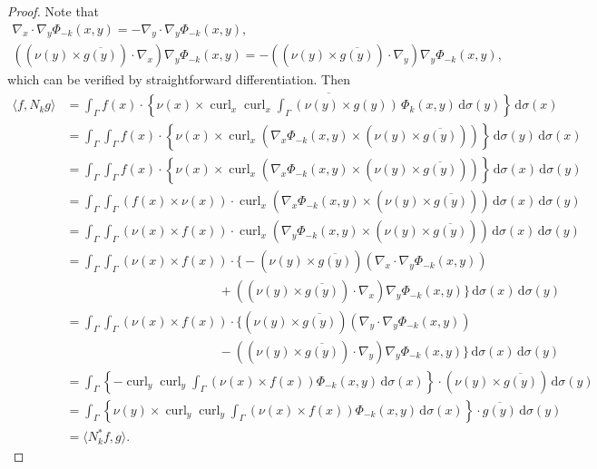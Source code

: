 \documentclass[a4paper,12pt]{article}
\theoremstyle{definition}
\newcommand\bdr{\Gamma}
\newcommand\ints[2][y]{\int_{\bdr}#2\,\text{d}\sigma(#1)}
\DeclareMathOperator\curl{curl}
\begin{document}
\begin{proof}
  Note that 
  \begin{gather*}
    \nabla_x\cdot\nabla_y\Phi_{-k}(x, y) = -\nabla_y\cdot\nabla_y\Phi_{-k}(x, y),\\
    \left(\left(\nu(y)\times\overline{g(y)}\right)\cdot\nabla_x\right)\nabla_y\Phi_{-k}(x, y) = -\left(\left(\nu(y)\times\overline{g(y)}\right)\cdot\nabla_y\right)\nabla_y\Phi_{-k}(x, y), 
  \end{gather*}
  which can be verified by straightforward differentiation. Then
  \begin{align*}
    \langle f, N_k g\rangle &= \ints[x]{f(x)\cdot\overline{\left\{\nu(x)\times\curl_x\curl_x\ints{\left(\nu(y)\times g(y)\right)\,\Phi_k(x,y)}\right\}}} \\
    &=\ints[x]{\ints{f(x)\cdot\left\{\nu(x)\times\curl_x\left(\nabla_x\Phi_{-k}(x, y)\times\left(\nu(y)\times\overline{g(y)}\right)\right)\right\}}} \\
    &=\ints{\ints[x]{f(x)\cdot\left\{\nu(x)\times\curl_x\left(\nabla_x\Phi_{-k}(x, y)\times\left(\nu(y)\times\overline{g(y)}\right)\right)\right\}}} \\
    &=\ints{\ints[x]{\left(f(x)\times\nu(x)\right)\cdot\curl_x\left(\nabla_x\Phi_{-k}(x, y)\times\left(\nu(y)\times\overline{g(y)}\right)\right)}} \\
    &=\ints{\ints[x]{\left(\nu(x)\times f(x)\right)\cdot\curl_x\left(\nabla_y\Phi_{-k}(x, y)\times\left(\nu(y)\times\overline{g(y)}\right)\right)}} \\
    &=\int_{\bdr}\int_{\bdr}\left(\nu(x)\times f(x)\right)\cdot\Big\{-\left(\nu(y)\times\overline{g(y)}\right)\left(\nabla_x\cdot\nabla_y\Phi_{-k}(x, y)\right) \\
    &\hspace{12em} + \left(\left(\nu(y)\times\overline{g(y)}\right)\cdot\nabla_x\right)\nabla_y\Phi_{-k}(x, y)\Big\}\,\text{d}\sigma(x)\,\text{d}\sigma(y) \\ %
    &=\int_{\bdr}\int_{\bdr}\left(\nu(x)\times f(x)\right)\cdot\Big\{\left(\nu(y)\times\overline{g(y)}\right)\left(\nabla_y\cdot\nabla_y\Phi_{-k}(x, y)\right) \\
    &\hspace{12em} - \left(\left(\nu(y)\times\overline{g(y)}\right)\cdot\nabla_y\right)\nabla_y\Phi_{-k}(x, y)\Big\}\,\text{d}\sigma(x)\,\text{d}\sigma(y) \\ %
    &=\ints{\left\{-\curl_y\curl_y\ints[x]{\left(\nu(x)\times f(x)\right)\Phi_{-k}(x, y)}\right\}\cdot\left(\nu(y)\times\overline{g(y)}\right)} \\
    &=\ints{\left\{\nu(y)\times\curl_y\curl_y\ints[x]{\left(\nu(x)\times f(x)\right)\Phi_{-k}(x, y)}\right\}\cdot\overline{g(y)}} \\
    &=\langle N_k^*f, g\rangle.
  \end{align*} 
\end{proof}
\end{document}
